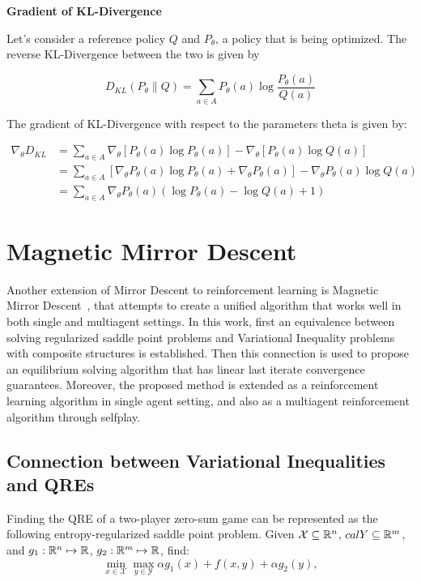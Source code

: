 \textbf{Gradient of KL-Divergence}

Let's consider a reference policy $Q$ and $P_{\theta}$, a policy that is being optimized. 
The reverse KL-Divergence between the two is given by

$$
D_{KL}(P_{\theta} \| Q) = \sum_{a \in A} P_{\theta}(a) \log \frac{P_{\theta}(a)}{Q(a)}
$$

The gradient of KL-Divergence with respect to the parameters theta is given by:

\begin{equation*}
	\begin{split}
\nabla_{\theta} D_{KL} &= \sum_{a \in A} \nabla_{\theta} [P_{\theta}(a) \log P_{\theta}(a)] - 
						\nabla_{\theta} [P_{\theta}(a) \log Q(a)] \\
						&= \sum_{a \in A} [\nabla_{\theta} P_{\theta}(a) \log P_{\theta}(a) + \nabla_{\theta} P_{\theta}(a)] -  
						 \nabla_{\theta} P_{\theta}(a) \log Q(a) \\
						&= \sum_{a \in A} \nabla_{\theta} P_{\theta}(a) (\log P_{\theta}(a) - \log Q(a) + 1)
	\end{split}
\end{equation*}

\section[MMD]{Magnetic Mirror Descent}

Another extension of Mirror Descent to reinforcement learning is Magnetic Mirror Descent~\cite{sokotaUnified2023}, 
that attempts to create a unified algorithm that works well in both single and multiagent settings.
In this work, first an equivalence between solving regularized saddle point problems
and Variational Inequality problems with composite structures is established. 
Then this connection is used to propose an equilibrium solving algorithm that has linear last iterate convergence guarantees. 
Moreover, the proposed method is extended as a reinforcement learning algorithm in single agent setting, and 
also as a multiagent reinforcement algorithm through selfplay.

\subsection{Connection between Variational Inequalities and QREs}

Finding the QRE of a two-player zero-sum game can be represented as the following entropy-regularized saddle
point problem. Given $\mathcal{X} \subseteq \mathbb{R}^n$, $calY \subseteq \mathbb{R}^m$, and $g_1: \mathbb{R}^n \mapsto \mathbb{R}$, $g_2: \mathbb{R}^m \mapsto \mathbb{R}$, 
find:
\begin{equation}
	\label{eqn:saddle} \min_{x \in \mathcal{X}}
	\max_{y \in \mathcal{Y}} \alpha g_1(x) + f(x, y) + \alpha g_2(y),
\end{equation}

